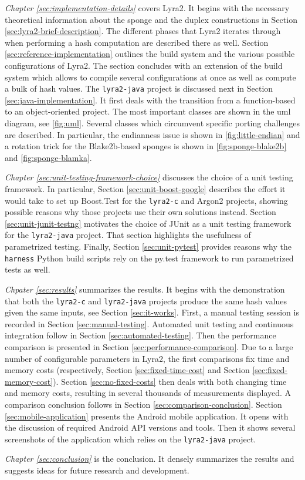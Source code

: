 \emph{Chapter \ref{sec:implementation-details}} covers Lyra2. It begins with the necessary theoretical information about the sponge and the duplex constructions in Section \ref{sec:lyra2-brief-description}. The different phases that Lyra2 iterates through when performing a hash computation are described there as well. Section \ref{sec:reference-implementation} outlines the build system and the various possible configurations of Lyra2. The section concludes with an extension of the build system which allows to compile several configurations at once as well as compute a bulk of hash values. The \texttt{lyra2-java} project is discussed next in Section \ref{sec:java-implementation}. It first deals with the transition from a function-based to an object-oriented project. The most important classes are shown in the \gls{uml} diagram, see \autoref{fig:uml}. Several classes which circumvent specific porting challenges are described. In particular, the endianness issue is shown in \autoref{fig:little-endian} and a rotation trick for the Blake2b-based sponges is shown in \autoref{fig:sponge-blake2b} and \autoref{fig:sponge-blamka}.

\emph{Chapter \ref{sec:unit-testing-framework-choice}} discusses the choice of a unit testing framework. In particular, Section \ref{sec:unit-boost-google} describes the effort it would take to set up Boost.Test for the \texttt{lyra2-c} and Argon2 projects, showing possible reasons why those projects use their own solutions instead. Section \ref{sec:unit-junit-testng} motivates the choice of JUnit as a unit testing framework for the \texttt{lyra2-java} project. That section highlights the usefulness of parametrized testing. Finally, Section \ref{sec:unit-pytest} provides reasons why the \texttt{harness} Python build scripts rely on the py.test framework to run parametrized tests as well.

\emph{Chpater \ref{sec:results}} summarizes the results. It begins with the demonstration that both the \texttt{lyra2-c} and \texttt{lyra2-java} projects produce the same hash values given the same inputs, see Section \ref{sec:it-works}. First, a manual testing session is recorded in Section \ref{sec:manual-testing}. Automated unit testing and continuous integration follow in Section \ref{sec:automated-testing}. Then the performance comparison is presented in Section \ref{sec:performance-comparison}. Due to a large number of configurable parameters in Lyra2, the first comparisons fix time and memory costs (respectively, Section \ref{sec:fixed-time-cost} and Section \ref{sec:fixed-memory-cost}). Section \ref{sec:no-fixed-costs} then deals with both changing time and memory costs, resulting in several thousands of measurements displayed. A comparison conclusion follows in Section \ref{sec:comparison-conclusion}. Section \ref{sec:mobile-application} presents the Android mobile application. It opens with the discussion of required Android API versions and tools. Then it shows several screenshots of the application which relies on the \texttt{lyra2-java} project.

\emph{Chapter \ref{sec:conclusion}} is the conclusion. It densely summarizes the results and suggests ideas for future research and development.
